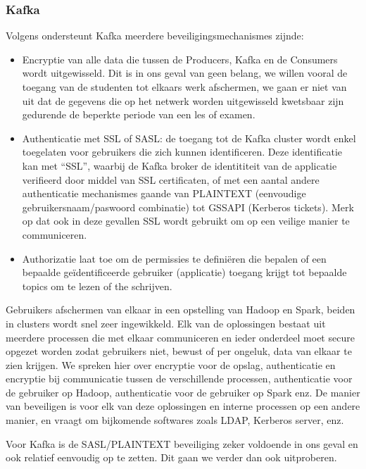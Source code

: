 \subsubsection {Kafka}
Volgens \textcite{Maarek2018} ondersteunt Kafka meerdere beveiligingsmechanismes zijnde:
\begin{itemize}
    \item Encryptie van alle data die tussen de Producers, Kafka en de Consumers wordt uitgewisseld. Dit is in ons geval van geen belang, we willen vooral de toegang van de studenten tot elkaars werk afschermen, we gaan er niet van uit dat de gegevens die op het netwerk worden uitgewisseld kwetsbaar zijn gedurende de beperkte periode van een les of examen.
    \item Authenticatie met SSL of SASL: de toegang tot de Kafka cluster wordt enkel toegelaten voor gebruikers die zich kunnen identificeren. Deze identificatie kan met ``SSL'', waarbij de Kafka broker de identititeit van de applicatie verifieerd door middel van SSL certificaten, of met een aantal andere authenticatie mechanismes gaande van PLAINTEXT (eenvoudige gebruikersnaam/paswoord combinatie) tot GSSAPI (Kerberos tickets). Merk op dat ook in deze gevallen SSL wordt gebruikt om op een veilige manier te communiceren.
    \item Authorizatie laat toe om de permissies te definiëren die bepalen of een bepaalde geïdentificeerde gebruiker (applicatie) toegang krijgt tot bepaalde topics om te lezen of the schrijven.
\end{itemize}


\newline
\newline
Gebruikers afschermen van elkaar in een opstelling van Hadoop en Spark, beiden in clusters wordt snel zeer ingewikkeld. Elk van de oplossingen bestaat uit meerdere processen die met elkaar communiceren en ieder onderdeel moet secure opgezet worden zodat gebruikers niet, bewust of per ongeluk, data van elkaar te zien krijgen. We spreken hier over encryptie voor de opslag, authenticatie en encryptie bij communicatie tussen de verschillende processen, authenticatie voor de gebruiker op Hadoop, authenticatie voor de gebruiker op Spark enz.
De manier van beveiligen is voor elk van deze oplossingen en interne processen op een andere manier, en vraagt om bijkomende softwares zoals LDAP, Kerberos server, enz.

Voor Kafka is de SASL/PLAINTEXT beveiliging zeker voldoende in ons geval en ook relatief eenvoudig op te zetten. Dit gaan we verder dan ook uitproberen.

